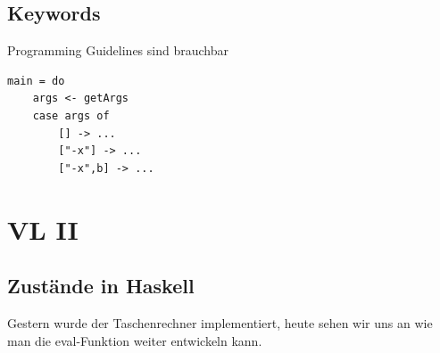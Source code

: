 \documentclass[ngerman,a4paper]{report}
\begin{document}
\section{Keywords}
Programming Guidelines sind brauchbar
\begin{lstlisting}
main = do 
	args <- getArgs
	case args of
		[] -> ...
		["-x"] -> ...
		["-x",b] -> ...
\end{lstlisting}

\chapter{VL II}
\section{Zustände in Haskell}
Gestern wurde der Taschenrechner implementiert, heute sehen wir uns an wie man die eval-Funktion weiter entwickeln kann.
\end{document}
